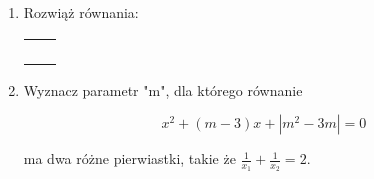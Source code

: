 \documentclass[12pt,a4paper]{article}
\begin{document}
	\begin{enumerate}[1.]
		
	\item Rozwiąż równania: %
	
	\begin{enumerate}[a)] \begin{tabular}{p{7cm} p{7cm}} 
			\item $||x+3|-4|=5$ & \vspace{0.4cm} 	\item$||x-1|-1|=|x-2|$ \\
			\item $\sqrt{x^2+4x+3}<\frac{25}{3}-\sqrt{x^2-6x+9}$ & \item $2x^2+x|2x-1|\leq3$ \\
			\item $(x-1)^2+|x-1|>6$ & \item $|x^2-3x|+x=2$ \\
			\item $x|x|+|2x-3|=4$ & \item $|x^2-|x|-2|>2$ \\
	\end{tabular} \end{enumerate}

	\item Wyznacz parametr "m", dla którego równanie 
	
	$$x^2+(m-3)x+|m^2-3m|=0$$
	
	ma dwa różne pierwiastki, takie że $\frac{1}{x_1}+\frac{1}{x_2}=2$.
		
	\end{enumerate}
	
	
	
\end{document}
